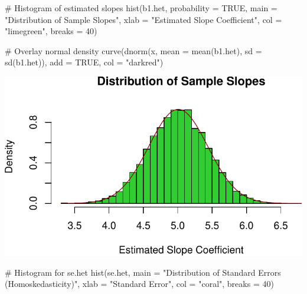 \documentclass[
  11pt,
]{article}
\newenvironment{Shaded}{\begin{snugshade}}{\end{snugshade}}
\newcommand{\AttributeTok}[1]{\textcolor[rgb]{0.40,0.45,0.13}{#1}}
\newcommand{\CommentTok}[1]{\textcolor[rgb]{0.37,0.37,0.37}{#1}}
\newcommand{\ConstantTok}[1]{\textcolor[rgb]{0.56,0.35,0.01}{#1}}
\newcommand{\DecValTok}[1]{\textcolor[rgb]{0.68,0.00,0.00}{#1}}
\newcommand{\FunctionTok}[1]{\textcolor[rgb]{0.28,0.35,0.67}{#1}}
\newcommand{\NormalTok}[1]{\textcolor[rgb]{0.00,0.23,0.31}{#1}}
\newcommand{\StringTok}[1]{\textcolor[rgb]{0.13,0.47,0.30}{#1}}
\begin{document}
\begin{Shaded}
\begin{Highlighting}[]
\CommentTok{\# Histogram of estimated slopes}
\FunctionTok{hist}\NormalTok{(b1.het, }\AttributeTok{probability =} \ConstantTok{TRUE}\NormalTok{, }
     \AttributeTok{main =} \StringTok{"Distribution of Sample Slopes"}\NormalTok{, }
     \AttributeTok{xlab =} \StringTok{"Estimated Slope Coefficient"}\NormalTok{, }\AttributeTok{col =} \StringTok{"limegreen"}\NormalTok{, }\AttributeTok{breaks =} \DecValTok{40}\NormalTok{)}

\CommentTok{\# Overlay normal density}
\FunctionTok{curve}\NormalTok{(}\FunctionTok{dnorm}\NormalTok{(x, }\AttributeTok{mean =} \FunctionTok{mean}\NormalTok{(b1.het), }\AttributeTok{sd =} \FunctionTok{sd}\NormalTok{(b1.het)), }\AttributeTok{add =} \ConstantTok{TRUE}\NormalTok{, }\AttributeTok{col =} \StringTok{"darkred"}\NormalTok{)}
\end{Highlighting}
\end{Shaded}

\includegraphics{HW-4-CODE-and-ANSWERS_files/figure-pdf/unnamed-chunk-17-3.pdf}

\begin{Shaded}
\begin{Highlighting}[]
\CommentTok{\# Histogram for se.het}
\FunctionTok{hist}\NormalTok{(se.het, }
     \AttributeTok{main =} \StringTok{"Distribution of Standard Errors (Homoskedasticity)"}\NormalTok{, }
     \AttributeTok{xlab =} \StringTok{"Standard Error"}\NormalTok{, }\AttributeTok{col =} \StringTok{"coral"}\NormalTok{, }\AttributeTok{breaks =} \DecValTok{40}\NormalTok{)}
\end{Highlighting}
\end{Shaded}
\end{document}
